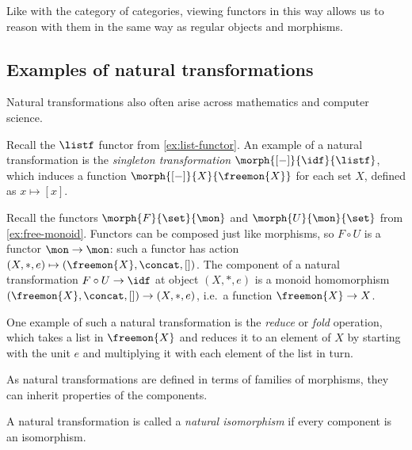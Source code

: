 Like with the category of categories, viewing functors in this way allows us to
reason with them in the same way as regular objects and morphisms.

\subsection{Examples of natural transformations}

Natural transformations also often arise across mathematics and
computer science.

\begin{example}[Singleton]
    Recall the \(\listf\) functor from \cref{ex:list-functor}.
    An example of a natural transformation is the
    \emph{singleton transformation} \(\morph{[-]}{\idf}{\listf}\), which
    induces a function \(\morph{[-]}{X}{\freemon{X}}\) for each set \(X\),
    defined as \(x \mapsto [x]\).
\end{example}

\begin{example}[Reduce]
    Recall the functors \(\morph{F}{\set}{\mon}\) and \(\morph{U}{\mon}{\set}\)
    from \cref{ex:free-monoid}.
    Functors can be composed just like morphisms, so \(F \circ U\) is a
    functor \(\mon \to \mon\): such a functor has action \(
    (X, *, e) \mapsto (\freemon{X}, \concat, [])
    \).
    The component of a natural transformation \(
    F \circ U \to \idf
    \) at object \((X, *, e)\) is a monoid homomorphism \(
    (\freemon{X}, \concat, []) \to (X, *, e)
    \), i.e.\ a function \(\freemon{X} \to X\).

    One example of such a natural transformation is the \emph{reduce} or
    \emph{fold} operation, which takes a list in \(\freemon{X}\) and reduces it
    to an element of \(X\) by starting with the unit \(e\) and multiplying it
    with each element of the list in turn.
\end{example}

As natural transformations are defined in terms of families of morphisms, they
can inherit properties of the components.

\begin{definition}
    A natural transformation is called a \emph{natural isomorphism} if every
    component is an isomorphism.
\end{definition}